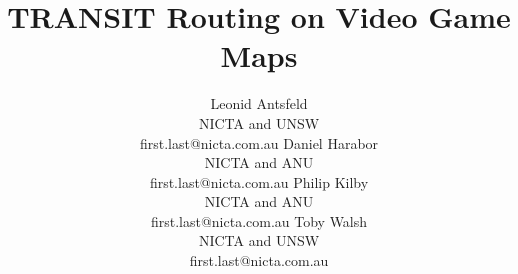 \documentclass{article}
\begin{document}
\title{TRANSIT Routing on Video Game Maps}
\author{
Leonid Antsfeld \\ NICTA and UNSW \\ first.last@nicta.com.au \And
Daniel Harabor \\ NICTA and ANU \\ first.last@nicta.com.au \And
Philip Kilby \\ NICTA and ANU \\ first.last@nicta.com.au \And
Toby Walsh \\ NICTA and UNSW \\ first.last@nicta.com.au
}
\maketitle












\end{document}
